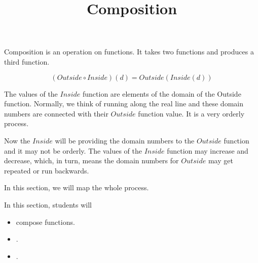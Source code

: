 \documentclass{ximera}
\title{Composition}
\begin{document}
\begin{abstract}
\end{abstract}
\maketitle













Composition is an operation on functions.  It takes two functions and produces a third function.


\[  (Outside \circ Inside)(d) = Outside(Inside(d))    \]


The values of the $Inside$ function are elements of the domain of the Outside function. Normally, we think of running along the real line and these domain numbers are connected with their $Outside$ function value.  It is a very orderly process.

Now the $Inside$ will be providing the domain numbers to the $Outside$ function and it may not be orderly. The values of the $Inside$ function may increase and decrease, which, in turn, means the domain numbers for $Outside$ may get repeated or run backwards.


In this section, we will map the whole process.
















\begin{sectionOutcomes}
In this section, students will 

\begin{itemize}
\item compose functions.
\item .
\item .
\end{itemize}
\end{sectionOutcomes}
\end{document}
